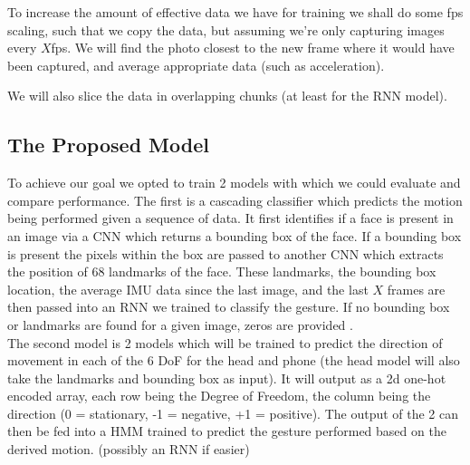 To increase the amount of effective data we have for training we shall do some fps scaling, such that we copy the data, but assuming we're only capturing images every $X$fps. We will find the photo closest to the new frame where it would have been captured, and average appropriate data (such as acceleration).

We will also slice the data in overlapping chunks (at least for the RNN model).



\subsection{The Proposed Model} %
%
To achieve our goal we opted to train 2 models with which we could evaluate and compare performance.
The first is a cascading classifier which predicts the motion being performed given a sequence of data.
It first identifies if a face is present in an image via a CNN which returns a bounding box of the face\cite{yu2022yunet}. If a bounding box is present the pixels within the box are passed to another CNN which extracts the position of 68 landmarks of the face\cite{guobing2021headpose}.
These landmarks, the bounding box location, the average IMU data since the last image, and the last $X$ frames are then passed into an RNN we trained to classify the gesture.
If no bounding box or landmarks are found for a given image, zeros are provided .
\\
The second model is 2 models which will be trained to predict the direction of movement in each of the 6 DoF for the head and phone (the head model will also take the landmarks and bounding box as input).
It will output as a 2d one-hot encoded array, each row being the Degree of Freedom, the column being the direction (0 = stationary, -1 = negative, +1 = positive).
The output of the 2 can then be fed into a HMM trained to predict the gesture performed based on the derived motion. (possibly an RNN if easier)

